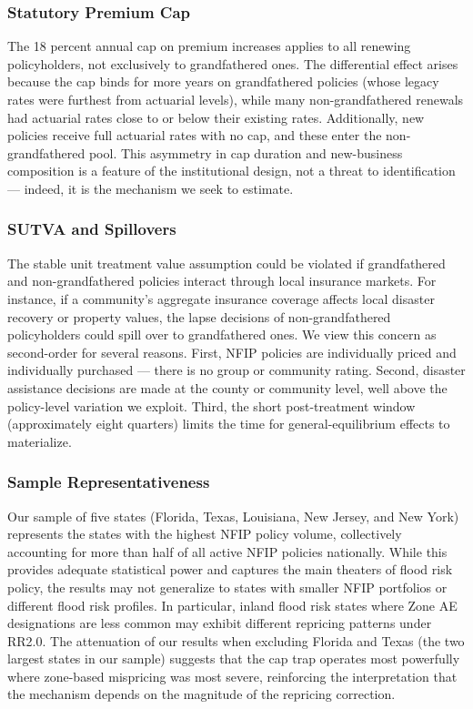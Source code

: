 \documentclass[12pt]{article}
\begin{document}
\subsubsection*{Statutory Premium Cap} The 18 percent annual cap on premium increases applies to all renewing policyholders, not exclusively to grandfathered ones. The differential effect arises because the cap binds for more years on grandfathered policies (whose legacy rates were furthest from actuarial levels), while many non-grandfathered renewals had actuarial rates close to or below their existing rates. Additionally, new policies receive full actuarial rates with no cap, and these enter the non-grandfathered pool. This asymmetry in cap duration and new-business composition is a feature of the institutional design, not a threat to identification --- indeed, it is the mechanism we seek to estimate.

\subsubsection*{SUTVA and Spillovers} The stable unit treatment value assumption could be violated if grandfathered and non-grandfathered policies interact through local insurance markets. For instance, if a community's aggregate insurance coverage affects local disaster recovery or property values, the lapse decisions of non-grandfathered policyholders could spill over to grandfathered ones. We view this concern as second-order for several reasons. First, NFIP policies are individually priced and individually purchased --- there is no group or community rating. Second, disaster assistance decisions are made at the county or community level, well above the policy-level variation we exploit. Third, the short post-treatment window (approximately eight quarters) limits the time for general-equilibrium effects to materialize.

\subsubsection*{Sample Representativeness} Our sample of five states (Florida, Texas, Louisiana, New Jersey, and New York) represents the states with the highest NFIP policy volume, collectively accounting for more than half of all active NFIP policies nationally. While this provides adequate statistical power and captures the main theaters of flood risk policy, the results may not generalize to states with smaller NFIP portfolios or different flood risk profiles. In particular, inland flood risk states where Zone AE designations are less common may exhibit different repricing patterns under RR2.0. The attenuation of our results when excluding Florida and Texas (the two largest states in our sample) suggests that the cap trap operates most powerfully where zone-based mispricing was most severe, reinforcing the interpretation that the mechanism depends on the magnitude of the repricing correction.
\end{document}
